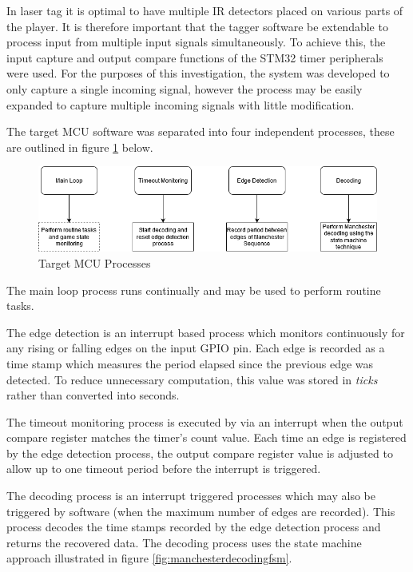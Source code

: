 In laser tag it is optimal to have multiple IR detectors placed on various parts of the player. It is therefore important that the tagger software be extendable to process input from multiple input signals simultaneously. To achieve this, the input capture and output compare functions of the STM32 timer peripherals were used. For the purposes of this investigation, the system was developed to only capture a single incoming signal, however the process may be easily expanded to capture multiple incoming signals with little modification.

The target MCU software was separated into four independent processes, these are outlined in figure \ref{fig:target_software_overview} below.

\begin{figure}[H]
	\centering
	\includegraphics[width=0.8\linewidth]{figures/design/target_software_overview.png}
	\caption{Target MCU Processes}
	\label{fig:target_software_overview}
\end{figure}

The main loop process runs continually and may be used to perform routine tasks.

The edge detection is an interrupt based process which monitors continuously for any rising or falling edges on the input GPIO pin. Each edge is recorded as a time stamp which measures the period elapsed since the previous edge was detected. To reduce unnecessary computation, this value was stored in \textit{ticks} rather than converted into seconds.

The timeout monitoring process is executed by via an interrupt when the output compare register matches the timer's count value. Each time an edge is registered by the edge detection process, the output compare register value is adjusted to allow up to one timeout period before the interrupt is triggered.

The decoding process is an interrupt triggered processes which may also be triggered by software (when the maximum number of edges are recorded). This process decodes the time stamps recorded by the edge detection process and returns the recovered data. The decoding process uses the state machine approach illustrated in figure \ref{fig:manchesterdecodingfsm}.

